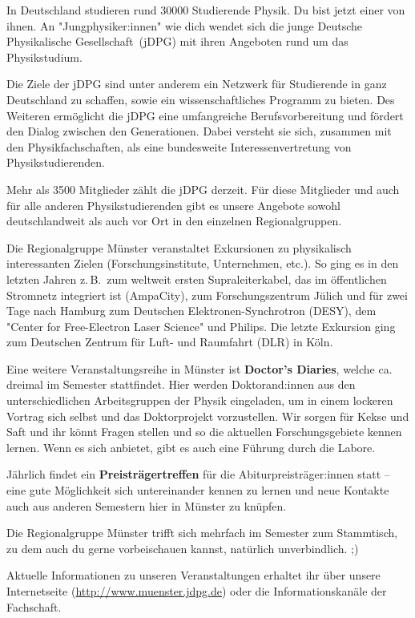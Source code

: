\begin{multicols}{2}
In Deutschland studieren rund \num{30000} Studierende Physik.
Du bist jetzt einer von ihnen.
An "Jungphysiker:innen" wie dich wendet sich die junge Deutsche Physikalische Gesellschaft~(jDPG) mit ihren Angeboten rund um das Physikstudium.

Die Ziele der jDPG sind unter anderem ein Netzwerk für Studierende in ganz Deutschland zu schaffen, sowie ein wissenschaftliches Programm zu bieten.
Des Weiteren ermöglicht die jDPG eine umfangreiche Berufsvorbereitung und fördert den Dialog zwischen den Generationen.
Dabei versteht sie sich, zusammen mit den Physikfachschaften, als eine bundesweite Interessenvertretung von Physikstudierenden.

Mehr als \num{3500} Mitglieder zählt die jDPG derzeit.
Für diese Mitglieder und auch für alle anderen Physikstudierenden gibt es unsere Angebote sowohl deutschlandweit als auch vor Ort in den einzelnen Regionalgruppen.

Die Regionalgruppe Münster veranstaltet Exkursionen zu physikalisch interessanten Zielen (Forschungsinstitute, Unternehmen, etc.).
So ging es in den letzten Jahren z.\,B.\ zum weltweit ersten Supraleiterkabel, das im öffentlichen Stromnetz integriert ist (AmpaCity), zum Forschungszentrum Jülich und für zwei Tage nach Hamburg zum Deutschen Elektronen-Synchrotron (DESY), dem "Center for Free-Electron Laser Science" und Philips. Die letzte Exkursion ging zum Deutschen Zentrum für Luft- und Raumfahrt (DLR) in Köln.

Eine weitere Veranstaltungsreihe in Münster ist \textbf{Doctor's Diaries}, welche ca. dreimal im Semester stattfindet. Hier werden Doktorand:innen aus den unterschiedlichen Arbeitsgruppen der Physik eingeladen, um in einem lockeren Vortrag sich selbst und das Doktorprojekt vorzustellen. Wir sorgen für Kekse und Saft und ihr könnt Fragen stellen und so die aktuellen Forschungsgebiete kennen lernen. Wenn es sich anbietet, gibt es auch eine Führung durch die Labore. 

Jährlich findet ein \textbf{Preisträgertreffen} für die Abiturpreisträger:innen statt -- eine gute Möglichkeit sich untereinander kennen zu lernen und neue Kontakte auch aus anderen Semestern hier in Münster zu knüpfen.


Die Regionalgruppe Münster trifft sich mehrfach im Semester zum Stammtisch, zu dem auch du gerne vorbeischauen kannst, natürlich unverbindlich. ;)


Aktuelle Informationen zu unseren Veranstaltungen erhaltet ihr über unsere Internetseite (\url{http://www.muenster.jdpg.de}) oder die Informationskanäle der Fachschaft.


\end{multicols}
